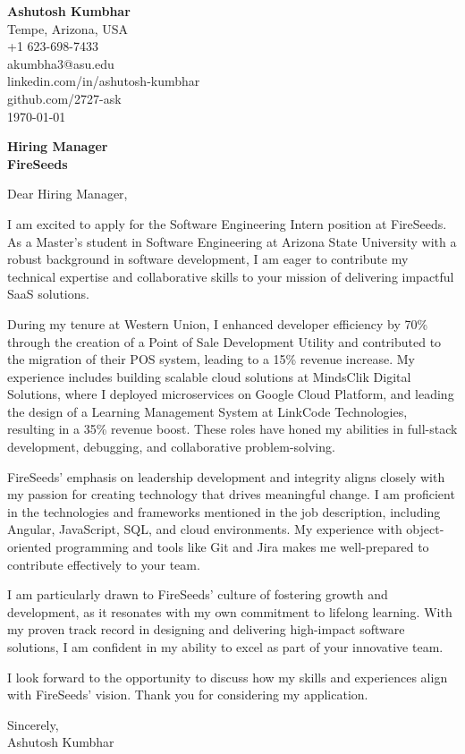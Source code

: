 \documentclass[11pt]{article}
\begin{document}
\begin{flushleft}
\textbf{Ashutosh Kumbhar} \\
Tempe, Arizona, USA \\
+1 623-698-7433 \\
akumbha3@asu.edu \\
linkedin.com/in/ashutosh-kumbhar \\
github.com/2727-ask \\
\today
\end{flushleft}

\vspace{0.5em}

\textbf{Hiring Manager} \\
\textbf{FireSeeds} \\

\vspace{1em}

Dear Hiring Manager,

I am excited to apply for the Software Engineering Intern position at FireSeeds. As a Master's student in Software Engineering at Arizona State University with a robust background in software development, I am eager to contribute my technical expertise and collaborative skills to your mission of delivering impactful SaaS solutions.

During my tenure at Western Union, I enhanced developer efficiency by 70\% through the creation of a Point of Sale Development Utility and contributed to the migration of their POS system, leading to a 15\% revenue increase. My experience includes building scalable cloud solutions at MindsClik Digital Solutions, where I deployed microservices on Google Cloud Platform, and leading the design of a Learning Management System at LinkCode Technologies, resulting in a 35\% revenue boost. These roles have honed my abilities in full-stack development, debugging, and collaborative problem-solving.

FireSeeds' emphasis on leadership development and integrity aligns closely with my passion for creating technology that drives meaningful change. I am proficient in the technologies and frameworks mentioned in the job description, including Angular, JavaScript, SQL, and cloud environments. My experience with object-oriented programming and tools like Git and Jira makes me well-prepared to contribute effectively to your team.

I am particularly drawn to FireSeeds' culture of fostering growth and development, as it resonates with my own commitment to lifelong learning. With my proven track record in designing and delivering high-impact software solutions, I am confident in my ability to excel as part of your innovative team.

I look forward to the opportunity to discuss how my skills and experiences align with FireSeeds' vision. Thank you for considering my application.

Sincerely, \\
Ashutosh Kumbhar
\end{document}
